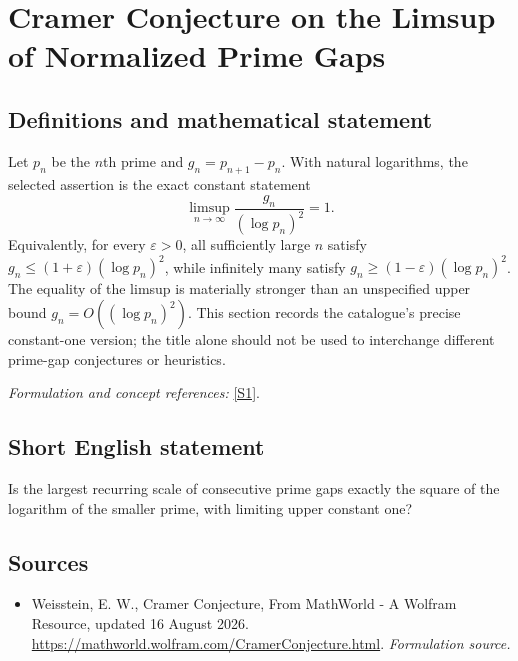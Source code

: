\documentclass[11pt]{article}
\begin{document}
\section*{\texorpdfstring{Cramer Conjecture on the Limsup of Normalized Prime Gaps}{Cramer Conjecture on the Limsup of Normalized Prime Gaps}}\label{statement}
\subsection{Definitions and mathematical statement}
Let $p_n$ be the $n$th prime and $g_n=p_{n+1}-p_n$. With natural logarithms, the selected assertion is the exact constant statement
\[
 \limsup_{n\to\infty}\frac{g_n}{(\log p_n)^2}=1.
\]
Equivalently, for every ${\varepsilon}>0$, all sufficiently large $n$ satisfy
$g_n\le(1+{\varepsilon})(\log p_n)^2$, while infinitely many satisfy
$g_n\ge(1-{\varepsilon})(\log p_n)^2$. The equality of the limsup is materially stronger than an unspecified upper bound $g_n=O((\log p_n)^2)$. This section records the catalogue's precise constant-one version; the title alone should not be used to interchange different prime-gap conjectures or heuristics.
\par\smallskip\textit{Formulation and concept references:} \href{https://mathworld.wolfram.com/CramerConjecture.html}{[S1]}.

\subsection{Short English statement}
Is the largest recurring scale of consecutive prime gaps exactly the square of the logarithm of the smaller prime, with limiting upper constant one?
\subsection{Sources}
\begin{itemize}
\item[S1]Weisstein, E. W., Cramer Conjecture, From MathWorld - A Wolfram Resource, updated 16 August 2026.
\url{https://mathworld.wolfram.com/CramerConjecture.html}.
\textit{Formulation source.}
\end{itemize}
\end{document}
